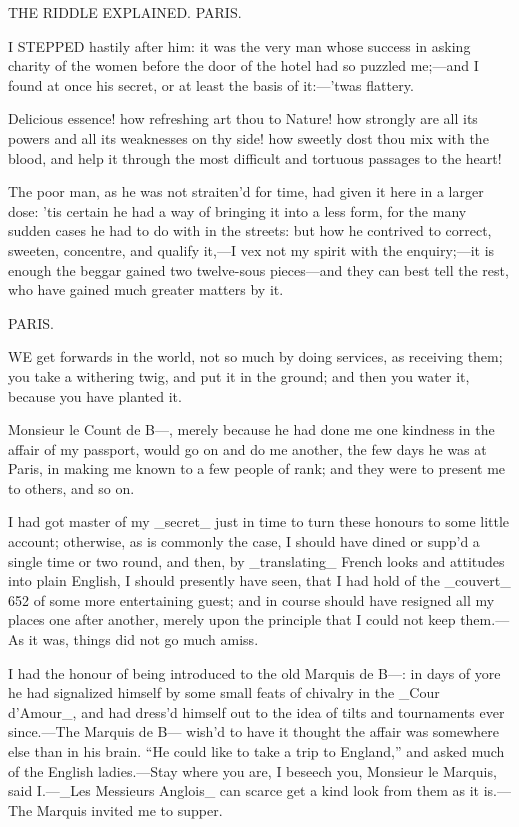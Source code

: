 \documentclass[twoside]{article}
\begin{document}
THE RIDDLE EXPLAINED.
PARIS.


I STEPPED hastily after him: it was the very man whose success in asking
charity of the women before the door of the hotel had so puzzled me;—and
I found at once his secret, or at least the basis of it:—’twas flattery.

Delicious essence! how refreshing art thou to Nature! how strongly are
all its powers and all its weaknesses on thy side! how sweetly dost thou
mix with the blood, and help it through the most difficult and tortuous
passages to the heart!

The poor man, as he was not straiten’d for time, had given it here in a
larger dose: ’tis certain he had a way of bringing it into a less form,
for the many sudden cases he had to do with in the streets: but how he
contrived to correct, sweeten, concentre, and qualify it,—I vex not my
spirit with the enquiry;—it is enough the beggar gained two twelve-sous
pieces—and they can best tell the rest, who have gained much greater
matters by it.




PARIS.


WE get forwards in the world, not so much by doing services, as receiving
them; you take a withering twig, and put it in the ground; and then you
water it, because you have planted it.

Monsieur le Count de B—, merely because he had done me one kindness in
the affair of my passport, would go on and do me another, the few days he
was at Paris, in making me known to a few people of rank; and they were
to present me to others, and so on.

I had got master of my _secret_ just in time to turn these honours to
some little account; otherwise, as is commonly the case, I should have
dined or supp’d a single time or two round, and then, by _translating_
French looks and attitudes into plain English, I should presently have
seen, that I had hold of the _couvert_ {652} of some more entertaining
guest; and in course should have resigned all my places one after
another, merely upon the principle that I could not keep them.—As it was,
things did not go much amiss.

I had the honour of being introduced to the old Marquis de B—: in days of
yore he had signalized himself by some small feats of chivalry in the
_Cour d’Amour_, and had dress’d himself out to the idea of tilts and
tournaments ever since.—The Marquis de B— wish’d to have it thought the
affair was somewhere else than in his brain.  “He could like to take a
trip to England,” and asked much of the English ladies.—Stay where you
are, I beseech you, Monsieur le Marquis, said I.—_Les Messieurs Anglois_
can scarce get a kind look from them as it is.—The Marquis invited me to
supper.
\end{document}
